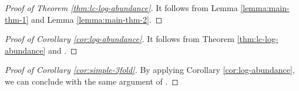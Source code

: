 \documentclass[12pt]{amsart}
\newcommand{\<}{\leq}
\def\>{\geq}
\theoremstyle{remark}
\theoremstyle{definition}
\theoremstyle{definition}
\numberwithin{equation}{section}
\theoremstyle{definition}
\theoremstyle{definition}
\begin{document}

\begin{proof}
[{Proof of Theorem \ref{thm:lc-log-abundance}}]
It follows from Lemma \ref{lemma:main-thm-1} and Lemma \ref{lemma:main-thm-2}.
\end{proof}


\begin{proof}
[{Proof of Corollary  \ref{cor:log-abundance}}]
It follows from  Theorem \ref{thm:lc-log-abundance} and \cite[Theorem 1.1]{DasOu2022}.
\end{proof} 


\begin{proof}
[{Proof of Corollary  \ref{cor:simple-3fold}}]
By applying Corollary \ref{cor:log-abundance}, we can conclude with the same argument  of \cite[Theorem 1.2]{CHP16}. 
\end{proof} 

 




\end{document}
